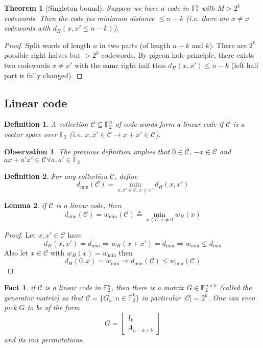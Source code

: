 \documentclass{article}
\newtheorem{theorem}{Theorem}[section]
\newtheorem{fact}{Fact}[section]
\newtheorem{observation}{Observation}[section]
\newtheorem{lemma}[theorem]{Lemma}
\newtheorem{definition}{Definition}[section]
\theoremstyle{definition} %
\def\F{\mathbb{F}}
\def\C{\mathscr{C}}
\begin{document}
\begin{theorem}[Singleton bound]
  Suppose we have a code in $\F_2^n$ with $M > 2^k$ codewords. Then the code jas minimum distance $\leq n - k$ (i.e. there are $x\not = x$ codewords with $d_H(x,x' \leq n-k)$).
\end{theorem}

\begin{proof}
  Split words of length $n$ in two parts (of length $n-k$ and $k$). There are $2^k$ possible right halves but $> 2^k$ codewords. By pigeon hole principle, there exists two codewords $x\not = x'$ with the same right half thus $d_H(x,x') \leq n-k$ (left half part is fully changed).
\end{proof}


\subsection{Linear code}

\begin{definition}
  A collection $\C \subseteq \F_2^n$ of code words form a linear code if $\C$ is a vector space over $\F_2$ (i.e. $x,x' \in \C \to x+x' \in \C$).
\end{definition}

\begin{observation}
  The previous definition implies that $0 \in \C$, $-x \in \C$ and $ax +a'x' \in \C \forall a,a' \in \F_2$
\end{observation}

\begin{definition}
  For any collection $\C$, define
  \[
    d_{\min}(\C) = \min_{x,x'\in \C, x\not=x'} d_H(x,x')
  \]
\end{definition}

\begin{lemma}
  if $\C$ is a linear code, then
  \[
    d_{\min}(\C) = w_{\min}(\C) \triangleq \min_{x\in \C, x \not=0} w_H(x)
  \]
\end{lemma}

\begin{proof}
  Let $x, x'\in \C$ have
  \[
    d_H(x,x') = d_{\min} \Rightarrow w_H(x+x') = d_{\min} \Rightarrow w_{\min} \leq d_{\min}
  \]
  Also let $x\in \C$ with $w_H(x) = w_{\min}$ then
  \[
    d_H(0,x) = w_{\min} \Rightarrow d_{\min}(\C) \leq w_{\min}(\C)
  \]
\end{proof}


\begin{fact}
  if $\C$ is a linear code in $\F_2^n$, then there is a matrix $G\in \F_2^{n\times k}$ (called the generator matrix) so that $\C = \{G_u : u \in \F_2^k \}$ in particular $|\C| = 2^k$. One can even pick $G$ to be of the form
  \[
    G=\begin{bmatrix}
      I_k\\
      A_{n-k\times k}
    \end{bmatrix}
  \]
  and its row permutations.
\end{fact}
\end{document}
